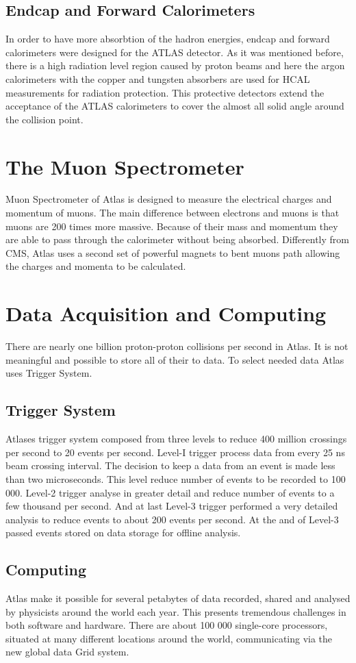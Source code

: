 \documentclass[a4paper,9pt]{article}
\begin{document}
\subsection{Endcap and Forward Calorimeters}
In order to have more absorbtion of the hadron energies, endcap and
forward calorimeters were designed for the ATLAS detector. As it was
mentioned before, there is a high radiation level region caused by proton
beams and here the argon calorimeters with the copper and tungsten absorbers
are used for HCAL measurements for radiation protection. This protective detectors extend the
acceptance of the ATLAS calorimeters to cover the almost all solid
angle around the collision point.

\section{The Muon Spectrometer}
Muon Spectrometer of Atlas is designed to measure the electrical charges and momentum of muons.
The main difference between electrons and muons is that muons are 200 times more massive.
Because of their mass and momentum they are able to pass through the calorimeter without being absorbed.
Differently from CMS, Atlas uses a second set of powerful magnets to bent muons path allowing the charges and momenta to be calculated.
\section{Data Acquisition and Computing}
There are nearly one billion proton-proton collisions per second in Atlas. It is not meaningful and
possible to store all of their to data. To select needed data Atlas uses Trigger System.
\subsection{Trigger System}
 
Atlases trigger system composed from three levels to reduce 400 million crossings per second to 20
events per second. Level-I trigger process data from every 25 ns beam crossing interval. The decision
to keep a data from an event is made less than two microseconds. This level reduce number of events
to be recorded to 100 000. Level-2 trigger analyse in greater detail and reduce number of events
to a few thousand per second. And at last Level-3 trigger performed a very detailed analysis to
reduce events to about 200 events per second. At the and of Level-3 passed events stored on data storage for offline analysis.
 
\subsection{Computing}
 
Atlas make it possible for several petabytes of data recorded, shared and analysed by physicists around
the world each year. This presents tremendous challenges in both software and hardware.
There are about 100 000 single-core processors, situated at many different locations around the world,
communicating via the new global data Grid system.
\end{document}
